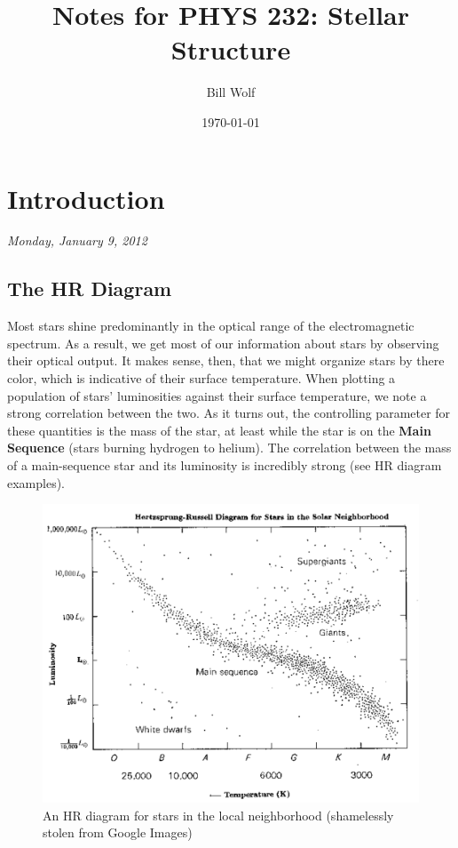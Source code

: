 \documentclass[10pt]{article}
\title{Notes for PHYS 232: Stellar Structure}
\author{Bill Wolf}
\date{\today}
\numberwithin{equation}{section}
\begin{document}
\vfill\maketitle\vfill \newpage

\tableofcontents \newpage


\section{Introduction}
	\emph{Monday, January 9, 2012}
	\subsection{The HR Diagram} 
	Most stars shine predominantly in the optical range of the electromagnetic spectrum. As a result, we get most of our information about stars by observing their optical output.  It makes sense, then, that we might organize stars by there color, which is indicative of their surface temperature. When plotting a population of stars' luminosities against their surface temperature, we note a strong correlation between the two. As it turns out, the controlling parameter for these quantities is the mass of the star, at least while the star is on the \textbf{Main Sequence} (stars burning hydrogen to helium). The correlation between the mass of a main-sequence star and its luminosity is incredibly strong (see HR diagram examples).
	\begin{figure}
		\centering
		\includegraphics[width=6in]{hr_local.pdf}
		\caption{An HR diagram for stars in the local neighborhood (shamelessly stolen from Google Images)}
		\label{HR.1f}
	\end{figure}
\end{document}
